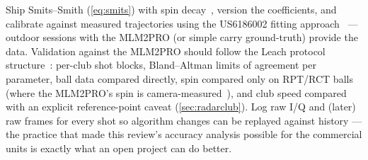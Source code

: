 Ship Smits--Smith (\cref{eq:smits}) with spin
decay~\cite{smitssmith}, version the coefficients, and calibrate
against measured trajectories using the US6186002 fitting
approach~\cite{us6186002} --- outdoor sessions with the MLM2PRO (or
simple carry ground-truth) provide the data. Validation against the
MLM2PRO should follow the Leach protocol
structure~\cite{leach2017}: per-club shot blocks, Bland--Altman limits
of agreement per parameter, ball data compared directly, spin compared
only on RPT/RCT balls (where the MLM2PRO's spin is
camera-measured~\cite{mygolfspymlm2pro}), and club speed compared with
an explicit reference-point caveat (\cref{sec:radarclub}). Log raw
I/Q and (later) raw frames for every shot so algorithm changes can be
replayed against history --- the practice that made this review's
accuracy analysis possible for the commercial units is exactly what an
open project can do better.
